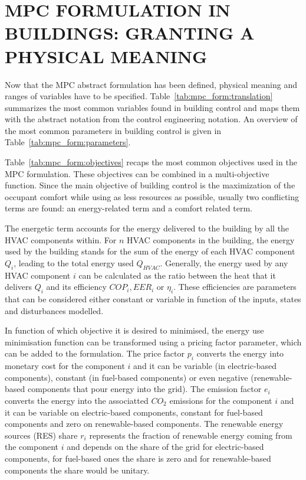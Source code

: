 \documentclass[10pt]{extarticle}
\begin{document}
\section{MPC FORMULATION IN BUILDINGS: GRANTING A PHYSICAL MEANING }

Now that the MPC abstract formulation has been defined, 
physical meaning and ranges of variables have to be specified.
Table~\ref{tab:mpc_form:translation} summarizes the most common
variables found in building control and maps them with the abstract
notation from the control engineering notation. 
An overview of the most common parameters in building control is given in Table~\ref{tab:mpc_form:parameters}.

Table~\ref{tab:mpc_form:objectives} recaps the most common objectives used 
in the MPC formulation. These objectives can be combined in a multi-objective
function. Since the main objective of building control is the maximization of 
the occupant comfort while using as less resources as possible,
usually two conflicting terms are found: an energy-related term
and a comfort related term.   
 
The energetic term accounts for the energy delivered to the building by all
the HVAC components within. For $n$ HVAC components in the building, 
the energy used by the building stands for the sum of the energy of each
HVAC component $Q_i$, leading to the total energy used $Q_{HVAC}$.
Generally, the energy used by any HVAC component $i$ can be calculated as the
ratio between the heat that it delivers $Q_i$ and its efficiency $COP_i, EER_i$ or $\eta_i$. 
These efficiencies are parameters that can be considered either constant or variable
in function of the inputs, states and disturbances modelled.

In function of which objective it is desired to minimised, the energy use
minimisation function can be transformed using a pricing factor parameter,
which can be added to the formulation. 
The price factor $p_i$ converts the energy into monetary cost 
for the component $i$ and it can be variable
(in electric-based components), constant (in fuel-based components) or even negative 
(renewable-based components that pour energy into the grid).
The emission factor $e_i$ converts the energy into the associatted $CO_2$ emissions 
for the component $i$ and it can be variable on electric-based components,
constant for fuel-based components and zero on renewable-based components.
The renewable energy sources (RES) share $r_i$ represents the fraction of renewable
energy coming from the component $i$ and depends on the share of the grid for
electric-based components, for fuel-based ones the share is zero and for
renewable-based components the share would be unitary.
\end{document}
